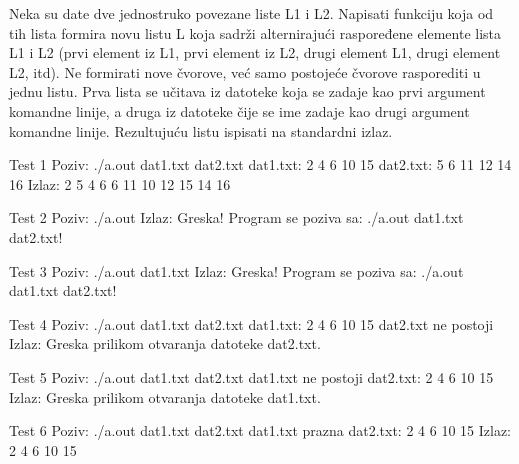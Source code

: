 

\begin{Exercise}[label=611]
Neka su date dve jednostruko povezane liste L1 i L2. Napisati funkciju koja od 
tih lista formira novu listu L koja sadrži alternirajući raspoređene elemente 
lista L1 i L2 (prvi element iz L1, prvi element iz L2, drugi element L1,
drugi element L2, itd). Ne formirati nove čvorove, već samo postojeće čvorove 
rasporediti u jednu listu. Prva lista se učitava iz datoteke koja se zadaje 
kao prvi argument komandne linije, a druga iz datoteke čije se ime zadaje kao 
drugi argument komandne linije. Rezultujuću listu ispisati 
na standardni izlaz. 

\begin{miditest}
  \begin{test}{Test 1}
Poziv: ./a.out dat1.txt dat2.txt
dat1.txt: 2 4 6 10 15
dat2.txt: 5 6 11 12 14 16
Izlaz:  2 5 4 6 6 11 10 12 15 14 16
  \end{test}
\end{miditest}

\begin{miditest}
  \begin{test}{Test 2}
Poziv: ./a.out
Izlaz: Greska! Program se poziva sa: ./a.out dat1.txt dat2.txt!
  \end{test}
\end{miditest}  
 
 
\begin{miditest}
  \begin{test}{Test 3}
Poziv: ./a.out dat1.txt 
Izlaz: Greska! Program se poziva sa: ./a.out dat1.txt dat2.txt!
  \end{test}
\end{miditest}


\begin{miditest}
  \begin{test}{Test 4}
Poziv: ./a.out dat1.txt dat2.txt
dat1.txt: 2 4 6 10 15
dat2.txt ne postoji
Izlaz: Greska prilikom otvaranja datoteke dat2.txt.
  \end{test}
\end{miditest}

\begin{miditest}
  \begin{test}{Test 5}
Poziv: ./a.out dat1.txt dat2.txt
dat1.txt ne postoji
dat2.txt: 2 4 6 10 15
Izlaz: Greska prilikom otvaranja datoteke dat1.txt.
  \end{test}
\end{miditest}
  
  
\begin{miditest}
  \begin{test}{Test 6}
Poziv: ./a.out dat1.txt dat2.txt
dat1.txt prazna
dat2.txt: 2 4 6 10 15
Izlaz: 2 4 6 10 15
  \end{test}
\end{miditest}
  
\end{Exercise}
